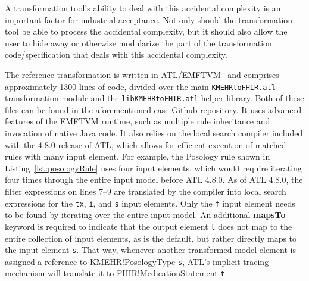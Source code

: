 \documentclass[
twocolumn,
]{ceurart}
\begin{document}
A transformation tool's ability to deal with this accidental complexity is an
important factor for industrial acceptance. Not only should the transformation
tool be able to process the accidental complexity, but it should also allow
the user to hide away or otherwise modularize the part of the transformation
code/specification that deals with this accidental complexity.

The reference transformation is written in ATL/EMFTVM~\cite{conf/models/Wagelaar2011}
and comprises approximately 1300 lines of code, divided over the main \texttt{KMEHRtoFHIR.atl}
transformation module and the \texttt{libKMEHRtoFHIR.atl} helper library. Both
of these files can be found in the aforementioned case Github repository. It uses
advanced features of the EMFTVM runtime, such as multiple rule inheritance and
invocation of native Java code. It also relies on the local search compiler
included with the 4.8.0 release of ATL, which allows for efficient
execution of matched rules with many input element. For example, the Posology
rule shown in Listing~\ref{lst:posologyRule} uses four input elements, which would
require iterating four times through the entire input model before ATL 4.8.0.
As of ATL 4.8.0, the filter expressions on lines 7--9 are translated by the compiler
into local search expressions for the \texttt{tx}, \texttt{i}, and \texttt{s} input
elements. Only the \texttt{f} input element needs to be found by iterating over
the entire input model. An additional \textbf{mapsTo} keyword is required to
indicate that the output element \texttt{t} does not map to the entire collection
of input elements, as is the default, but rather directly maps to the input
element \texttt{s}. That way, whenever another transformed model element is
assigned a reference to KMEHR!PosologyType \texttt{s}, ATL's implicit tracing
mechanism will translate it to FHIR!MedicationStatement \texttt{t}.
\end{document}
